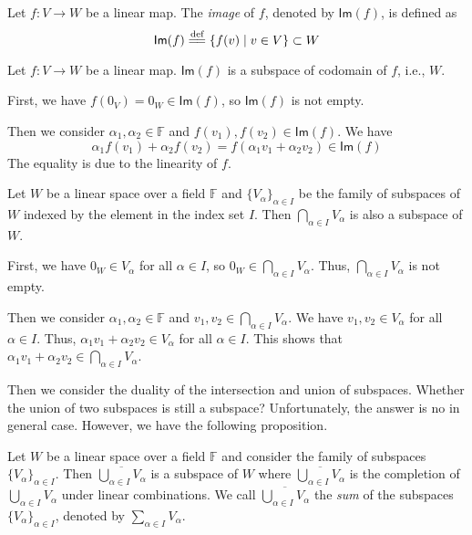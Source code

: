 \documentclass[
	11pt, %
	fleqn, %
	a4paper, %
]{LegrandOrangeBook}
\renewcommand{\Im}[1]{\mathsf{Im}(#1)} %
\renewcommand{\bar}[1]{\overline{#1}} %
\newcommand{\F}{\mathbb{F}} %
\begin{document}
\begin{definition}[Images]
    Let $f : V \to W$ be a linear map. The \emph{image} of $f$, denoted by $\Im f$, is defined as 
    \[
        \Im f \overset{\text{def}}{=\joinrel=} \{ f(v) \mid v \in V \} \subset W
    \]
\end{definition}

\begin{example}
    Let $f : V \to W$ be a linear map. $\Im f$ is a subspace of codomain of $f$, i.e., $W$.

    First, we have $f(0_V) = 0_W \in \Im f$, so $\Im f$ is not empty.

    Then we consider $\alpha_1, \alpha_2 \in \F$ and $f(v_1), f(v_2) \in \Im f$. We have 
    \[
        \alpha_1 f(v_1) + \alpha_2 f(v_2) = f(\alpha_1 v_1 + \alpha_2 v_2) \in \Im f
    \]
    The equality is due to the linearity of $f$.
\end{example}

\begin{example}
    Let $W$ be a linear space over a field $\F$ and $\{V_\alpha\}_{\alpha \in I}$ be the family of subspaces of $W$ indexed by the element in the index set $I$. Then $\bigcap_{\alpha \in I} V_\alpha$ is also a subspace of $W$.

    First, we have $0_W \in V_\alpha$ for all $\alpha \in I$, so $0_W \in \bigcap_{\alpha \in I} V_\alpha$. Thus, $\bigcap_{\alpha \in I} V_\alpha$ is not empty.

    Then we consider $\alpha_1, \alpha_2 \in \F$ and $v_1, v_2 \in \bigcap_{\alpha \in I} V_\alpha$. We have $v_1, v_2 \in V_\alpha$ for all $\alpha \in I$. Thus, $\alpha_1 v_1 + \alpha_2 v_2 \in V_\alpha$ for all $\alpha \in I$. This shows that $\alpha_1 v_1 + \alpha_2 v_2 \in \bigcap_{\alpha \in I} V_\alpha$.
\end{example}

Then we consider the duality of the intersection and union of subspaces. Whether the union of two subspaces is still a subspace? Unfortunately, the answer is no in general case. However, we have the following proposition.

\begin{proposition}
    Let $W$ be a linear space over a field $\F$ and consider the family of subspaces $\{V_\alpha\}_{\alpha \in I}$. Then $\bar{\bigcup_{\alpha \in I} V_\alpha}$ is a subspace of $W$ where $\bar{\bigcup_{\alpha \in I} V_\alpha}$ is the completion of $\bigcup_{\alpha \in I} V_\alpha$ under linear combinations. We call $\bar{\bigcup_{\alpha \in I} V_\alpha}$ the \emph{sum} of the subspaces $\{V_\alpha\}_{\alpha \in I}$, denoted by $\sum_{\alpha \in I} V_\alpha$.
\end{proposition}
\end{document}
